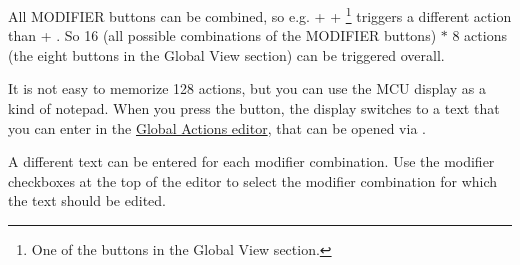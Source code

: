 All MODIFIER
buttons can be combined, so e.g. \shift + \alt + \footnote{One of the buttons in the
Global View section.} triggers a different action than \shift + . So
16 (all possible combinations of the MODIFIER buttons) $\ast$ 8 actions
(the eight buttons in the Global View section) can be triggered overall.

It is not easy to memorize 128 actions, but you can use the MCU display as a
kind of notepad. When you press the \nv button, the display switches to a text
that you can enter in the \hyperref[F:Screenshot_Actions_Dialog]{Global Actions
editor}, that can be opened via \alt \nv. 


A different text can be entered for each modifier combination. Use the modifier
checkboxes at the top of the editor to select the modifier combination for
which the text should be edited.

